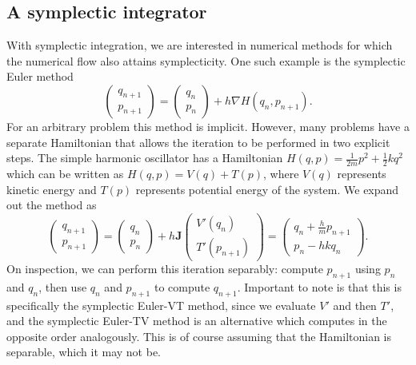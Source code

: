 \documentclass{report}
\theoremstyle{exampstyle} \newtheorem{example}[theorem]{Example}
\theoremstyle{exampstyle} \newtheorem{remark}[theorem]{Remark}
\theoremstyle{exampstyle} \newtheorem{definition}[theorem]{Definition}
\theoremstyle{exampstyle} \newtheorem{lemma}[theorem]{Lemma}
\begin{document}
\subsection{A symplectic integrator}
With symplectic integration, we are interested in numerical methods for which the numerical flow also attains symplecticity.
One such example is the symplectic Euler method
\begin{equation*}
	\begin{pmatrix}
		q_{n+1} \\
		p_{n+1} 
	\end{pmatrix} = \begin{pmatrix}
		q_{n} \\
		p_{n}
	\end{pmatrix} + h \nabla H(q_{n}, p_{n+1}).
\end{equation*}
For an arbitrary problem this method is implicit. However, many problems have a separate Hamiltonian that allows the iteration to be performed in two explicit steps. 
The simple harmonic oscillator has a Hamiltonian $H(q, p) = \frac{1}{2m}p^2 + \frac{1}{2}kq^2$ which can be written as $H(q, p) = V(q) + T(p)$, where $V(q)$ represents kinetic energy and $T(p)$ represents potential energy of the system.
We expand out the method as
\begin{equation*}
	\begin{pmatrix}
		q_{n+1} \\
		p_{n+1} 
	\end{pmatrix} = \begin{pmatrix}
		q_{n} \\
		p_{n}
	\end{pmatrix} + h \mathbf{J} \begin{pmatrix}
		V'(q_n) \\
		T'(p_{n+1})
	\end{pmatrix} = \begin{pmatrix}
		q_{n} + \frac{h}{m}p_{n+1} \\
		p_{n} - hk q_n
	\end{pmatrix}.
\end{equation*}
On inspection, we can perform this iteration separably: compute $p_{n+1}$ using $p_n$ and $q_n$,
then use $q_n$ and $p_{n+1}$ to compute $q_{n+1}$.
Important to note is that this is specifically the symplectic Euler-VT method, since we evaluate $V'$ and then $T'$,
and the symplectic Euler-TV method is an alternative which computes in the opposite order analogously.
This is of course assuming that the Hamiltonian is separable, which it may not be.
\end{document}
